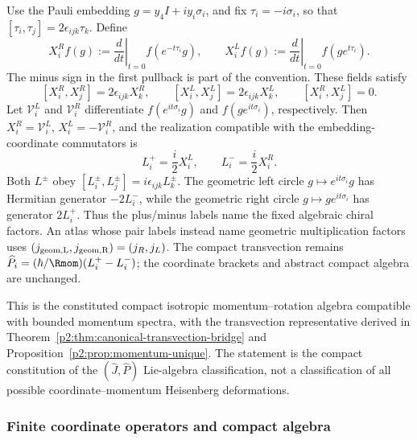 \documentclass[12pt,a4paper]{article}
\begin{document}
\begin{remark}
Use the Pauli embedding \(g=y_4I+i y_i\sigma_i\), and fix
\(\tau_i=-i\sigma_i\), so that
\([\tau_i,\tau_j]=2\epsilon_{ijk}\tau_k\).  Define
\[
 X_i^R f(g):=\left.\frac{d}{dt}\right|_{t=0}f(e^{-t\tau_i}g),
 \qquad
 X_i^L f(g):=\left.\frac{d}{dt}\right|_{t=0}f(ge^{t\tau_i}).
\]
The minus sign in the first pullback is part of the convention.  These fields
satisfy
\[
 [X_i^R,X_j^R]=2\epsilon_{ijk}X_k^R,\qquad
 [X_i^L,X_j^L]=2\epsilon_{ijk}X_k^L,\qquad [X_i^R,X_j^L]=0.
\]
Let \(\mathcal V_i^L\) and \(\mathcal V_i^R\) differentiate
\(f(e^{it\sigma_i}g)\) and \(f(ge^{it\sigma_i})\), respectively.
Then \(X_i^R=\mathcal V_i^L\), \(X_i^L=-\mathcal V_i^R\), and the
realization compatible with the embedding-coordinate commutators is
\[
 \boxed{L_i^+=\frac{i}{2}X_i^L,\qquad
        L_i^-=\frac{i}{2}X_i^R.}
\]
Both \(L^\pm\) obey \([L_i^\pm,L_j^\pm]=i\epsilon_{ijk}L_k^\pm\).
The geometric left circle \(g\mapsto e^{it\sigma_i}g\) has Hermitian
generator \(-2L_i^-\), while the geometric right circle
\(g\mapsto ge^{it\sigma_i}\) has generator \(2L_i^+\).
Thus the plus/minus labels name the fixed algebraic chiral factors.
An atlas whose pair labels instead name geometric multiplication factors
uses \((j_{\rm geom,L},j_{\rm geom,R})=(j_R,j_L)\).
The compact transvection remains
\(\widehat P_i=(\hbar/\Rmom)(L_i^+-L_i^-)\);
the coordinate brackets and abstract compact algebra are unchanged.
\end{remark}

This is the constituted compact isotropic momentum--rotation algebra
compatible with bounded momentum spectra, with the transvection representative
derived in Theorem~\ref{p2:thm:canonical-transvection-bridge} and
Proposition~\ref{p2:prop:momentum-unique}.  The statement is the compact
constitution of the \((\hat J,\hat P)\) Lie-algebra classification, not a
classification of all possible coordinate--momentum Heisenberg deformations.

\subsubsection{Finite coordinate operators and compact algebra}
\label{p2:sec:position-operators}
\end{document}
